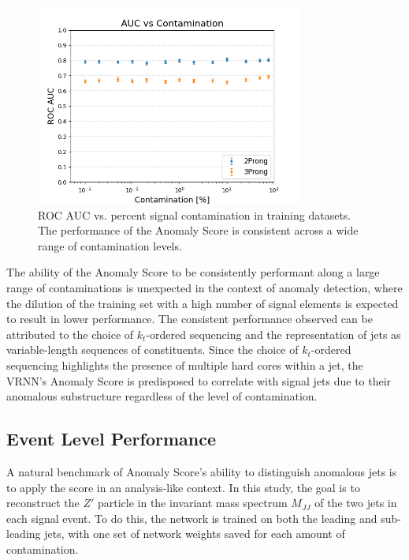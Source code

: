 \documentclass[12pt, a4paper]{article}
\begin{document}
\begin{figure}[H]
	\begin{center}
		\includegraphics[width=250pt]{imgs/AUC_vs_Contam_SaveForPaper.png}
	\end{center}
	\caption{ROC AUC vs. percent signal contamination in training datasets. The performance of the Anomaly Score is consistent across a wide range of contamination levels.}
	\label{fig:aucs_vs_contam}
\end{figure}


The ability of the Anomaly Score to be consistently performant along a large range of contaminations is unexpected in the context of anomaly detection, where the dilution of the training set with a high number of signal elements is expected to result in lower performance.
The consistent performance observed can be attributed to the choice of $k_t$-ordered sequencing and the representation of jets as variable-length sequences of constituents. Since the choice of $k_t$-ordered sequencing highlights the presence of multiple hard cores within a jet, the VRNN's Anomaly Score is predisposed to correlate with signal jets due to their anomalous substructure regardless of the level of contamination.




\subsection{Event Level Performance}


A natural benchmark of Anomaly Score's ability to distinguish anomalous jets is to apply the score in an analysis-like context. In this study, the goal is to reconstruct the $Z'$ particle in the invariant mass spectrum $M_{JJ}$ of the two jets in each signal event. To do this, the network is trained on both the leading and sub-leading jets, with one set of network weights saved for each amount of contamination. 
\end{document}
